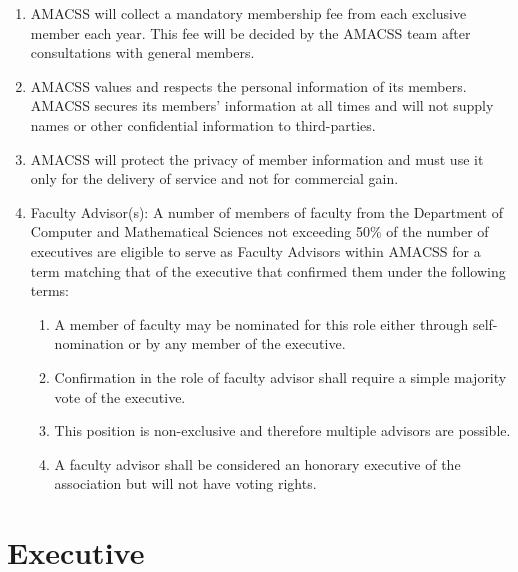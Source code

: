 \documentclass[12pt,a4paper]{article}
\begin{document}
\begin{enumerate}
\item AMACSS will collect a mandatory membership fee from each exclusive member each year. This fee will be decided by the AMACSS team after consultations with general members.

\item AMACSS values and respects the personal information of its members. AMACSS secures its members' information at all times and will not supply names or other confidential information to third-parties.

\item AMACSS will protect the privacy of member information and must use it only for the delivery of service and not for commercial gain.

\item Faculty Advisor(s): A number of members of faculty from the Department of Computer and Mathematical Sciences not exceeding 50\% of the number of executives are eligible to serve as Faculty Advisors within AMACSS for a term matching that of the executive that confirmed them under the following terms:

\begin{enumerate}
\item A member of faculty may be nominated for this role either through self-nomination or by any member of the executive.

\item Confirmation in the role of faculty advisor shall require a simple majority vote of the executive.

\item This position is non-exclusive and therefore multiple advisors are possible.

\item A faculty advisor shall be considered an honorary executive of the association but will not have voting rights.
\end{enumerate}
\end{enumerate}

\section{Executive}
\end{document}
